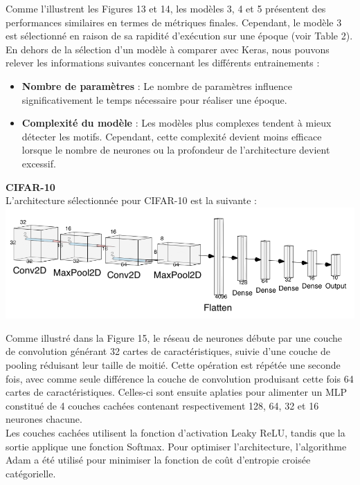 \begin{multicols}{2}
Comme l’illustrent les Figures 13 et 14, les modèles 3, 4 et 5 présentent des performances similaires en termes de 
métriques finales. Cependant, le modèle 3 est sélectionné en raison de sa rapidité d’exécution sur une 
époque (voir Table 2). \\

En dehors de la sélection d’un modèle à comparer avec Keras, nous pouvons relever les informations suivantes concernant les différents entrainements :
\begin{itemize}
\item \textbf{Nombre de paramètres} : Le nombre de paramètres influence significativement le temps nécessaire pour réaliser une époque.
\item \textbf{Complexité du modèle} : Les modèles plus complexes tendent à mieux détecter les motifs. Cependant, cette complexité devient moins efficace 
lorsque le nombre de neurones ou la profondeur de l’architecture devient excessif.
\end{itemize} 
\hfill\break

\textbf{CIFAR-10} \\

L'architecture sélectionnée pour CIFAR-10 est la suivante : \\

\includegraphics[width=\columnwidth]{images/cifar10_nn.png}
\hfill\break


Comme illustré dans la Figure 15, le réseau de neurones débute par une couche de convolution générant 32 cartes de caractéristiques, suivie d’une couche de pooling réduisant leur taille de moitié. 
Cette opération est répétée une seconde fois, avec comme seule différence la couche de convolution produisant cette fois 64 cartes de caractéristiques.
Celles-ci sont ensuite aplaties pour alimenter un MLP constitué de 4 couches cachées contenant respectivement 128, 64, 32 et 16 neurones chacune. \\

Les couches cachées utilisent la fonction d’activation Leaky ReLU, tandis que la sortie 
applique une fonction Softmax. Pour optimiser l'architecture, l’algorithme Adam a été utilisé pour minimiser 
la fonction de coût d’entropie croisée catégorielle. \\


\end{multicols}
